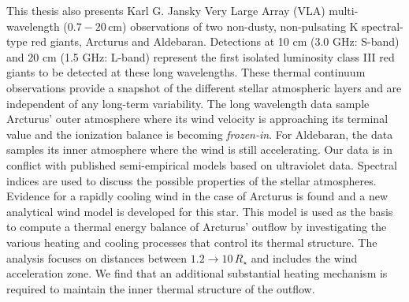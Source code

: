\begin{abstracts}
This thesis also presents Karl G. Jansky Very Large Array (VLA) multi-wavelength ($0.7 - 20$\,cm) observations of two non-dusty, non-pulsating K spectral-type red giants, Arcturus and Aldebaran. Detections at 10 cm (3.0 GHz: S-band) and 20 cm (1.5 GHz: L-band) represent the first isolated luminosity class III red giants to be detected at these long wavelengths. These thermal continuum observations provide  a snapshot of the different stellar atmospheric layers and are independent of any long-term variability. The long wavelength data sample Arcturus' outer atmosphere where its wind velocity is approaching its terminal value and the ionization balance is becoming \textit{frozen-in}. For Aldebaran, the data samples its inner atmosphere where the wind is still accelerating. Our data is in conflict with published semi-empirical models based on ultraviolet data. Spectral indices are used to discuss the possible properties of the stellar atmospheres. Evidence for a rapidly cooling wind in the case of Arcturus is found and a new analytical wind model is developed for this star. This model is used as the basis to compute a thermal energy balance of Arcturus' outflow by investigating the various heating and cooling processes that control its thermal structure. The analysis focuses on distances between $1.2\rightarrow 10\,R_{\star}$ and includes the wind acceleration zone. We find that an additional substantial heating mechanism is required to maintain the inner thermal structure of the outflow.

\end{abstracts}

